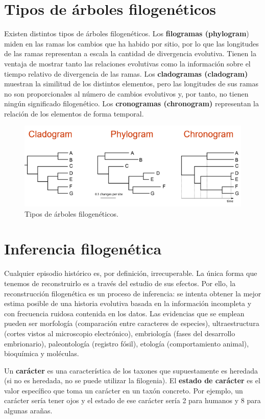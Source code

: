 \section{Tipos de árboles filogenéticos}
Existen distintos tipos de árboles filogenéticos. Los \textbf{filogramas (phylogram}) miden en las ramas los cambios que ha habido por sitio, por lo que las longitudes de las ramas representan a escala la cantidad de divergencia evolutiva. Tienen la ventaja de mostrar tanto las relaciones evolutivas como la información sobre el tiempo relativo de divergencia de las ramas. Los \textbf{cladogramas (cladogram)} muestran la similitud de los distintos elementos, pero las longitudes de sus ramas no son proporcionales al número de cambios evolutivos y, por tanto, no tienen ningún significado filogenético. Los \textbf{cronogramas (chronogram)} representan la relación de los elementos de forma temporal.

\begin{figure}[htbp]
\centering
\includegraphics[width=0.5\linewidth]{figs/tipos-arboles.png}
\caption{Tipos de árboles filogenéticos.}
\end{figure}

\section{Inferencia filogenética}
Cualquier episodio histórico es, por definición, irrecuperable. La única forma que tenemos de reconstruirlo es a través del estudio de sus efectos. Por ello, la reconstrucción filogenética es un proceso de inferencia: se intenta obtener la mejor estima posible de una historia evolutiva basada en la información incompleta y con frecuencia ruidosa contenida en los datos. Las evidencias que se emplean pueden ser morfología (comparación entre caracteres de especies), ultraestructura (cortes vistos al microscopio electrónico), embriología (fases del desarrollo embrionario), paleontología (registro fósil), etología (comportamiento animal), bioquímica y moléculas. 

Un \textbf{carácter} es una característica de los taxones que supuestamente es heredada (si no es heredada, no se puede utilizar la filogenia). El \textbf{estado de carácter} es el valor específico que toma un carácter en un taxón concreto. Por ejemplo, un carácter sería tener ojos y el estado de ese carácter sería 2 para humanos y 8 para algunas arañas.

